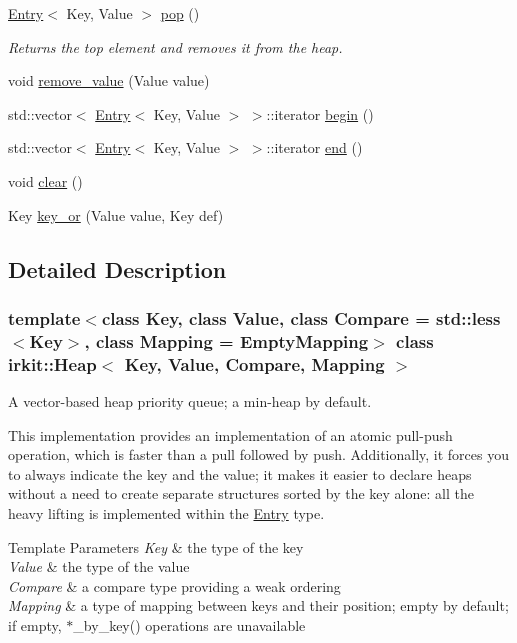 \begin{DoxyCompactItemize}
\mbox{\hyperlink{structirkit_1_1Entry}{Entry}}$<$ Key, Value $>$ \mbox{\hyperlink{classirkit_1_1Heap_afd4759dce1fe72d513e4b8e7766ec94e}{pop}} ()
\begin{DoxyCompactList}\small\item\em Returns the top element and removes it from the heap. \end{DoxyCompactList}\item 
void \mbox{\hyperlink{classirkit_1_1Heap_a0da9e0bc583dadad14b10d285e7a8925}{remove\+\_\+value}} (Value value)
\item 
std\+::vector$<$ \mbox{\hyperlink{structirkit_1_1Entry}{Entry}}$<$ Key, Value $>$ $>$\+::iterator \mbox{\hyperlink{classirkit_1_1Heap_af996708917bb42b8cc660988c5c5ed62}{begin}} ()
\item 
std\+::vector$<$ \mbox{\hyperlink{structirkit_1_1Entry}{Entry}}$<$ Key, Value $>$ $>$\+::iterator \mbox{\hyperlink{classirkit_1_1Heap_a8451f5ab1ccb727e7964ce94e5ae3b6c}{end}} ()
\item 
void \mbox{\hyperlink{classirkit_1_1Heap_a06373b7aa5262ffc4efe381042e8cb50}{clear}} ()
\item 
Key \mbox{\hyperlink{classirkit_1_1Heap_a2fffaaf281662d57d13dcc1b0618dc0d}{key\+\_\+or}} (Value value, Key def)
\end{DoxyCompactItemize}


\subsection{Detailed Description}
\subsubsection*{template$<$class Key, class Value, class Compare = std\+::less$<$\+Key$>$, class Mapping = Empty\+Mapping$>$\newline
class irkit\+::\+Heap$<$ Key, Value, Compare, Mapping $>$}

A vector-\/based heap priority queue; a min-\/heap by default.

This implementation provides an implementation of an atomic pull-\/push operation, which is faster than a pull followed by push. Additionally, it forces you to always indicate the key and the value; it makes it easier to declare heaps without a need to create separate structures sorted by the key alone\+: all the heavy lifting is implemented within the \mbox{\hyperlink{structirkit_1_1Entry}{Entry}} type.


\begin{DoxyTemplParams}{Template Parameters}
{\em Key} & the type of the key \\
\hline
{\em Value} & the type of the value \\
\hline
{\em Compare} & a compare type providing a weak ordering \\
\hline
{\em Mapping} & a type of mapping between keys and their position; empty by default; if empty, $\ast$\+\_\+by\+\_\+key() operations are unavailable \\
\hline
\end{DoxyTemplParams}


